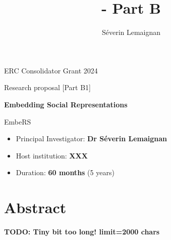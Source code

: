 \documentclass[11pt,a4paper]{report}
\title{\project - Part B}
\author{Séverin Lemaignan}
\newcommand{\project}{EmbeRS\xspace}
\newcommand{\TODO}[1]{{\color{red}\textbf{TODO: #1}}}
\newcommand{\eu}[1]{}
\begin{document}
\maketitle

\begin{center}
    ERC Consolidator Grant 2024

    Research proposal [Part B1]

    \vspace{2cm}

    \textbf{\LARGE Embedding Social Representations}

    \vspace{2cm}
    {\Huge \project}

\end{center}

    \vspace{2cm}

\begin{itemize}
    \item Principal Investigator: \textbf{Dr Séverin Lemaignan}
    \item Host institution: \textbf{XXX}
    \item Duration: \textbf{60 months} (5 years)
\end{itemize}

\section*{Abstract}\label{abstract}

\eu{The abstract (summary) should, at a glance, provide the reader with a clear
understanding of the objectives of the research proposal and how they will be
achieved. The abstract will be used as the short description of your research
proposal in the evaluation process and in communications to contact in
particular the potential remote referees and/or inform the Commission and/or the
programme management committees and/or relevant national funding agencies
(provided you give permission to do so where requested in the online proposal
submission forms, section 1). It must therefore be short and precise and should
not contain confidential information. \\
Please use plain typed text, avoiding formulae and other special characters. The
abstract must be written in English. There is a limit of 2000 characters (spaces
and line breaks included).}

\TODO{Tiny bit too long! limit=2000 chars}
\end{document}
